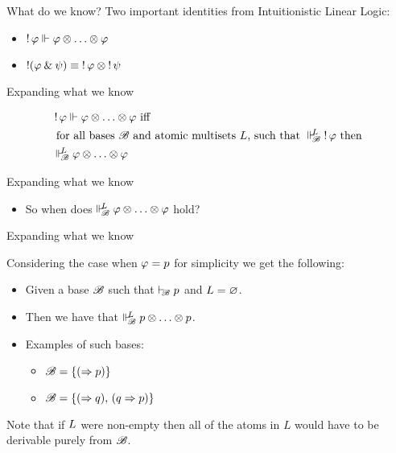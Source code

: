 \documentclass{beamer}
\begin{document}
\begin{frame}{What do we know?}
	Two important identities from Intuitionistic Linear Logic:
	\begin{itemize}
	\item $\mathop{!}\varphi \Vdash_{ \!\! }^{ \!\! } \varphi \otimes \ldots \otimes \varphi$
	\item $\mathop{!}(\varphi\mathbin{\&}\psi)\equiv\mathop{!}\varphi\otimes\mathop{!}\psi$
	\end{itemize}
\end{frame}
\begin{frame}{Expanding what we know}
	\begin{center}
	\begin{align*}
	&\bang\varphi \suppM{}{} \varphi \mand \ldots \mand \varphi \text{ iff } \\
	&\text{ for all bases } \baseB \text{ and atomic multisets } \at{L} \text{, such that } \suppM{\baseB}{\at{L}} \bang\varphi \text{ then } \\ 
	&\suppM{\baseB}{\at{L}} \varphi \mand \ldots \mand \varphi
	\end{align*}
	\end{center}
\end{frame}
\begin{frame}{Expanding what we know}
	\begin{center}
	\begin{itemize}
	\item So when does $\Vdash_{ \!\!\mathscr{B} }^{ \!\!{L} } \varphi \otimes \ldots \otimes \varphi$ hold?
	\end{itemize}
	\end{center}
\end{frame}
\begin{frame}{Expanding what we know}
	\begin{center}
	Considering the case when $\varphi = {p}$ for simplicity we get the following:
	\begin{itemize}
	\pause
	\item Given a base $\mathscr{B}$ such that $\vdash_{\!\!\mathscr{B}}{p}$ and ${L}=\varnothing$.
	\pause
	\item Then we have that $\Vdash_{ \!\!\mathscr{B} }^{ \!\!{L} }{p} \otimes \ldots \otimes {p}$.
	\pause
	\item Examples of such bases:
	\begin{itemize}
		\item $\mathscr{B} = \{ (\Rightarrow p)\}$
		\item $\mathscr{B} = \{(\Rightarrow q),\, (q\Rightarrow p) \}$
	\end{itemize}
	\pause
	\end{itemize} 
	\vspace{10pt}
	Note that if ${L}$ were non-empty then all of the atoms in $L$ would have to be derivable purely from $\mathscr{B}$.
	\end{center}
\end{frame}
\end{document}
